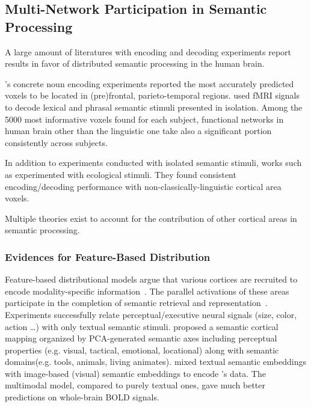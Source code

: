 \subsection{Multi-Network Participation in Semantic Processing}
\label{subsec:multinetworkParticipation}
A large amount of literatures with encoding and decoding experiments report results in favor of distributed semantic processing in the human brain. 

\textcite{mitchellPredictingHumanBrain2008}'s concrete noun encoding experiments reported the most accurately predicted voxels to be located in (pre)frontal, parieto-temporal regions. \textcite{pereiraUniversalDecoderLinguistic2018} used fMRI signals to decode lexical and phrasal semantic stimuli presented in isolation. Among the 5000 most informative voxels found for each subject, functional networks in human brain other than the linguistic one take also a significant portion consistently across subjects. 

In addition to experiments conducted with isolated semantic stimuli, works such as \textcite{todorovicAnalysesIRMfLors2018, verdierEncodageActiviteNeuronale2018, huthContinuousSemanticSpace2012} experimented with ecological stimuli. They found consistent encoding\slash decoding performance with non-classically-linguistic cortical area voxels.

Multiple theories exist to account for the contribution of other cortical areas in semantic processing.   

\subsubsection{Evidences for Feature-Based Distribution}
\label{subsec: featurebaseddistribution}
Feature-based distributional models argue that various cortices are recruited to encode modality-specific information~\parencite{chaoAttributebasedNeuralSubstrates1999, haukSomatotopicRepresentationAction2004, goldbergPerceptualKnowledgeRetrieval2006}. The parallel activations of these areas participate in the completion of semantic retrieval and representation~\parencite{pattersonWhereYouKnow2007}. Experiments \parencite{borghesaniWordMeaningVentral2016, moseleySensorimotorSemanticsSpot2013, shtyrovDistributedNeuronalNetworks2004} successfully relate perceptual\slash executive neural signals (size, color, action \dots) with only textual semantic stimuli. \textcite{huthNaturalSpeechReveals2016} proposed a semantic cortical mapping organized by PCA-generated semantic axes including perceptual properties (e.g. visual, tactical, emotional, locational) along with semantic domains(e.g. tools, animals, living animates). \textcite{rowtulaDeepAutoencoderNearPerfect2018} mixed textual semantic embeddings with image-based (visual) semantic embeddings to encode \textcite{pereiraUniversalDecoderLinguistic2018}'s data. The multimodal model, compared to purely textual ones, gave much better predictions on whole-brain BOLD signals.


